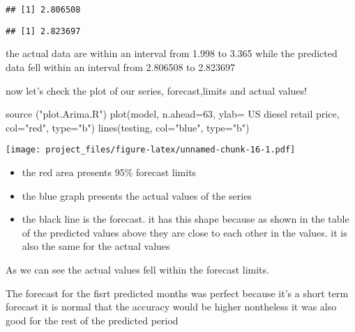 \documentclass[
]{article}
\newenvironment{Shaded}{\begin{snugshade}}{\end{snugshade}}
\newcommand{\AttributeTok}[1]{\textcolor[rgb]{0.77,0.63,0.00}{#1}}
\newcommand{\DecValTok}[1]{\textcolor[rgb]{0.00,0.00,0.81}{#1}}
\newcommand{\FunctionTok}[1]{\textcolor[rgb]{0.00,0.00,0.00}{#1}}
\newcommand{\NormalTok}[1]{#1}
\newcommand{\SpecialCharTok}[1]{\textcolor[rgb]{0.00,0.00,0.00}{#1}}
\newcommand{\StringTok}[1]{\textcolor[rgb]{0.31,0.60,0.02}{#1}}
\begin{document}
\begin{verbatim}
## [1] 2.806508
\end{verbatim}

\begin{Shaded}
\end{Shaded}

\begin{verbatim}
## [1] 2.823697
\end{verbatim}

the actual data are within an interval from 1.998 to 3.365 while the
predicted data fell within an interval from 2.806508 to 2.823697

now let's check the plot of our series, forecast,limits and actual
values!

\begin{Shaded}
\begin{Highlighting}[]
\FunctionTok{source}\NormalTok{ (}\StringTok{"plot.Arima.R"}\NormalTok{)}
\FunctionTok{plot}\NormalTok{(model, }\AttributeTok{n.ahead=}\DecValTok{63}\NormalTok{, }\AttributeTok{ylab=} \StringTok{\textquotesingle{}US diesel retail price\textquotesingle{}}\NormalTok{, }\AttributeTok{col=}\StringTok{"red"}\NormalTok{, }\AttributeTok{type=}\StringTok{"b"}\NormalTok{)}
\FunctionTok{lines}\NormalTok{(testing, }\AttributeTok{col=}\StringTok{"blue"}\NormalTok{, }\AttributeTok{type=}\StringTok{"b"}\NormalTok{)}
\end{Highlighting}
\end{Shaded}

\texttt{[image: project\_files/figure-latex/unnamed-chunk-16-1.pdf]}

\begin{itemize}
\item
  the red area presents 95\% forecast limits
\item
  the blue graph presents the actual values of the series
\item
  the black line is the forecast. it has this shape because as shown in
  the table of the predicted values above they are close to each other
  in the values. it is also the same for the actual values
\end{itemize}

As we can see the actual values fell within the forecast limits.

The forecast for the fisrt predicted months was perfect because it's a
short term forecast it is normal that the accuracy would be higher
nontheless it was also good for the rest of the predicted period
\end{document}
